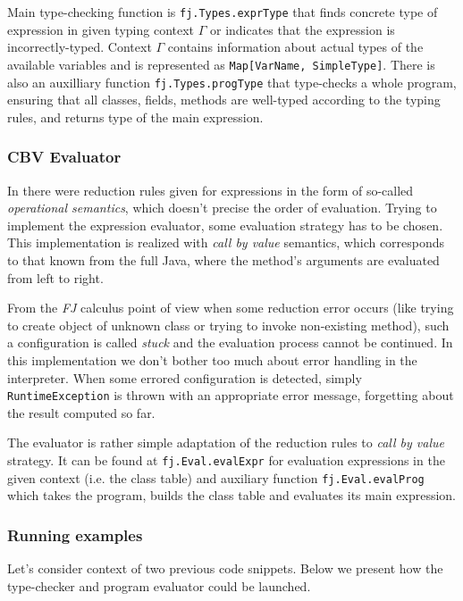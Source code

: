 \documentclass{article}[12pt]
\begin{document}
Main type-checking function is \texttt{fj.Types.exprType} that
finds concrete type of expression in given typing context $\Gamma$
or indicates that the expression is incorrectly-typed. Context
$\Gamma$ contains information about actual types of the available
variables and is represented as \texttt{Map[VarName, SimpleType]}.
There is also an auxilliary function \texttt{fj.Types.progType}
that type-checks a whole program, ensuring that all classes, fields,
methods are well-typed according to the typing rules, and returns
type of the main expression.

\subsubsection{CBV Evaluator}

In \cite{fj} there were reduction rules given for expressions in
the form of so-called \emph{operational semantics}, which doesn't
precise the order of evaluation. Trying to implement the expression
evaluator, some evaluation strategy has to be chosen. This
implementation is realized with \emph{call by value} semantics,
which corresponds to that known from the full Java, where
the method's arguments are evaluated from left to right.

From the \emph{FJ} calculus point of view when some reduction error
occurs (like trying to create object of unknown class or trying to
invoke non-existing method), such a configuration is called
\emph{stuck} and the evaluation process cannot be continued.
In this implementation we don't bother too much about error
handling in the interpreter. When some errored configuration is
detected, simply \texttt{RuntimeException} is thrown with
an appropriate error message, forgetting about the result
computed so far.

The evaluator is rather simple adaptation of the reduction rules to
\emph{call by value} strategy. It can be found at
\texttt{fj.Eval.evalExpr} for evaluation expressions in the given
context (i.e. the class table) and auxiliary function
\texttt{fj.Eval.evalProg} which takes the program, builds the
class table and evaluates its main expression.

\subsubsection{Running examples}

Let's consider context of two previous code snippets. Below
we present how the type-checker and program evaluator could be
launched.
\end{document}
